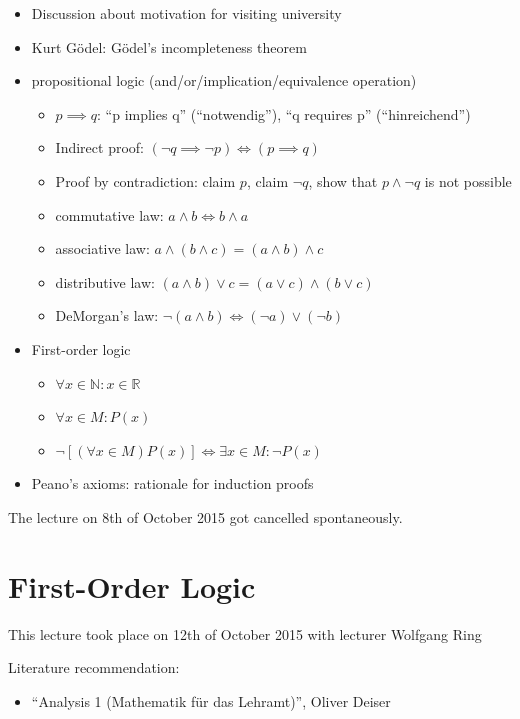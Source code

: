 \documentclass[a4paper,landscape,twocolumn]{article}
\theoremstyle{definition}
\newcommand\meta[3]{\begin{mdframed}[skipbelow=4pt,skipabove=4pt,innermargin=1pt,innerleftmargin=1pt,innerrightmargin=1pt]\begin{center}\small{\textdownarrow{} This #1 took place on #2 with lecturer #3}\end{center}\end{mdframed}}
\begin{document}
\begin{itemize}
  \item Discussion about motivation for visiting university
  \item Kurt Gödel: Gödel's incompleteness theorem
  \item propositional logic (and/or/implication/equivalence operation)
  \begin{itemize}
    \item $p \implies q$: \enquote{p implies q} (\enquote{notwendig}), \enquote{q requires p} (\enquote{hinreichend})
    \item Indirect proof: $(\neg q \implies \neg p) \iff (p \implies q)$
    \item Proof by contradiction: claim $p$, claim $\neg q$, show that $p \land \neg q$ is not possible
    \item commutative law: $a \land b \iff b \land a$
    \item associative law: $a \land (b \land c) = (a \land b) \land c$
    \item distributive law: $(a \land b) \lor c = (a \lor c) \land (b \lor c)$
    \item DeMorgan's law: $\neg (a \land b) \iff (\neg a) \lor (\neg b)$
  \end{itemize}
  \item First-order logic
  \begin{itemize}
    \item $\forall x \in \mathbb{N}: x \in \mathbb{R}$
    \item $\forall x \in M: P(x)$
    \item $\neg \left[(\forall x \in M) P(x)\right] \iff \exists x \in M: \neg P(x)$
  \end{itemize}
  \item Peano's axioms: rationale for induction proofs
\end{itemize}

The lecture on 8th of October 2015 got cancelled spontaneously.

\section{First-Order Logic}
\meta{lecture}{12th of October 2015}{Wolfgang Ring}

Literature recommendation:
\begin{itemize}
  \item \enquote{\foreignlanguage{ngerman}{Analysis 1 (Mathematik für das Lehramt)}}, Oliver Deiser
\end{itemize}
\end{document}
